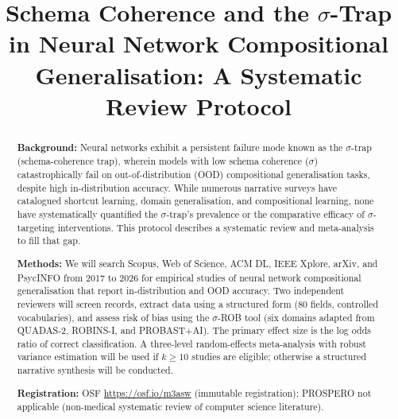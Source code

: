

\title{Schema Coherence and the $\sigma$-Trap in Neural Network Compositional Generalisation: A Systematic Review Protocol}

\author*[1]{ }



\begin{abstract}
\textbf{Background:} Neural networks exhibit a persistent failure mode known as the $\sigma$-trap (schema-coherence trap), wherein models with low schema coherence ($\sigma$) catastrophically fail on out-of-distribution (OOD) compositional generalisation tasks, despite high in-distribution accuracy. While numerous narrative surveys have catalogued shortcut learning, domain generalisation, and compositional learning, none have systematically quantified the $\sigma$-trap's prevalence or the comparative efficacy of $\sigma$-targeting interventions. This protocol describes a systematic review and meta-analysis to fill that gap.

\textbf{Methods:} We will search Scopus, Web of Science, ACM DL, IEEE Xplore, arXiv, and PsycINFO from 2017 to 2026 for empirical studies of neural network compositional generalisation that report in-distribution and OOD accuracy. Two independent reviewers will screen records, extract data using a structured form (80 fields, controlled vocabularies), and assess risk of bias using the $\sigma$-ROB tool (six domains adapted from QUADAS-2, ROBINS-I, and PROBAST+AI). The primary effect size is the log odds ratio of correct classification. A three-level random-effects meta-analysis with robust variance estimation will be used if $k \geq 10$ studies are eligible; otherwise a structured narrative synthesis will be conducted.

\textbf{Registration:} OSF \url{https://osf.io/m3asw} (immutable registration); PROSPERO not applicable (non-medical systematic review of computer science literature).
\end{abstract}

\maketitle


